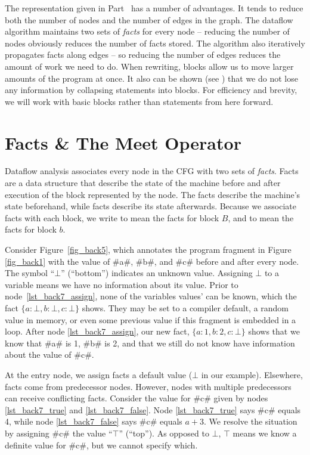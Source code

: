 \documentclass[12pt]{report}
\begin{document}
The representation given in Part~ has a number of
advantages. It tends to reduce both the number of nodes and the number
of edges in the graph. The dataflow algorithm maintains two sets of
\emph{facts} for every node -- reducing the number of nodes obviously
reduces the number of facts stored. The algorithm also iteratively
propagates facts along edges -- so reducing the number of edges
reduces the amount of work we need to do. When rewriting, blocks allow
us to move larger amounts of the program at once. It also can be shown
(see \citep{AhoXX}) that we do not lose any information by collapsing
statements into blocks. For efficiency and brevity, we will work with
basic blocks rather than statements from here forward.


\section{Facts \& The Meet Operator}
\label{sec_back4}
Dataflow analysis associates every node in the CFG with two sets of
\emph{facts}. Facts are a data structure that describe the state of
the machine before and after execution of the block represented
by the node. The \inE facts describe the machine's state beforehand,
while \out facts describe its state afterwards. Because we associate facts
with each block, we write \inB to mean the \inE facts for block $B$, and
\outB to mean the \out facts for block $b$.

Consider Figure~\ref{fig_back5}, which annotates the program fragment
in Figure \ref{fig_back1} with the value of #a#, #b#, and #c# before
and after every node. The symbol ``$\bot$'' (``bottom'') indicates an
unknown value. Assigning $\bot$ to a variable means we have no
information about its value. Prior to node~\ref{lst_back7_assign},
none of the variables values' can be known, which the fact $\{a :
\bot,b : \bot,c : \bot\}$ shows. They may be set to a compiler
default, a random value in memory, or even some previous value if this
fragment is embedded in a loop. After node \ref{lst_back7_assign}, our
new fact, $\{a : 1,b : 2,c : \bot\}$ shows that we know that #a#
is 1, #b# is 2, and that we still do not know have information about
the value of #c#.

\afterpage{\clearpage\clearpage}

At the entry node, we assign \inE facts a default value ($\bot$
in our example). Elsewhere, \inE facts come from predecessor
nodes. However, nodes with multiple predecessors can receive
conflicting facts. Consider the value for #c# given by nodes
\ref{lst_back7_true} and \ref{lst_back7_false}. Node
\ref{lst_back7_true} says #c# equals 4, while node
\ref{lst_back7_false} says #c# equals $a + 3$. We resolve the
situation by assigning #c# the value ``$\top$'' (``top''). As opposed
to $\bot$, $\top$ means we know a definite value for #c#, but we
cannot specify which.
\end{document}

